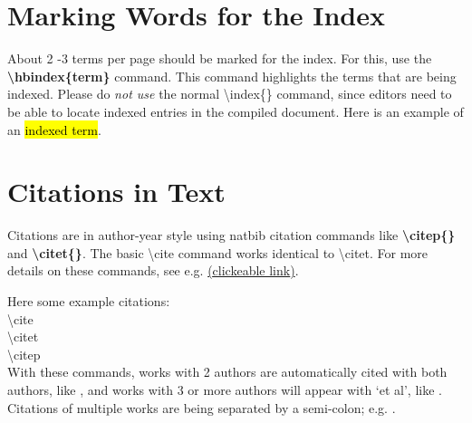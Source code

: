 \documentclass[graybox,natbib,nosecnum]{svmult}
\newcommand{\hbindex}[1]{\hl{#1}\index{#1}}  %
\begin{document}
\section{Marking Words for the Index}
About 2 -3 terms per page should be marked for the index.  For this, use the {\bf \textbackslash hbindex\{term\}} command. This command highlights the terms that are being indexed. Please do \emph{not use} the normal \textbackslash index\{\} command, since editors need to be able to locate indexed entries in the compiled document.  Here is an example of an \hbindex{indexed term}.

\section{Citations in Text}
Citations are in author-year style using natbib citation commands like {\bf \textbackslash citep\{\}} and {\bf \textbackslash citet\{\}}. The basic \textbackslash cite command works identical to \textbackslash citet. For more details on these commands, see e.g. \href{http://osl.ugr.es/CTAN/macros/latex/contrib/natbib/natnotes.pdf} {(\ul{clickeable link})}.

Here some example citations:\\
\cite{akaike74}  \textbackslash cite\\
\citet{akaike74} \textbackslash citet\\
\citep{akaike74} \textbackslash citep\\
With these commands, works with 2 authors are automatically cited with both authors, like \citep{Boisnard06}, and works with 3 or more authors will appear with `et al', like \citep{2013A&A...550A..67P}. Citations of multiple works are being separated by a semi-colon; e.g. \citep{akaike74, giclas+71}.
\end{document}
